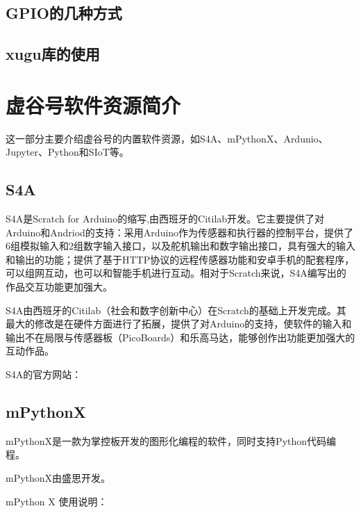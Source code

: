 \documentclass[letterpaper,10pt,english]{sphinxmanual}
\begin{document}
\section{GPIO的几种方式}
\label{\detokenize{04.gpio/4.1:gpio}}\label{\detokenize{04.gpio/4.1::doc}}

\section{xugu库的使用}
\label{\detokenize{04.gpio/4.2:xugu}}\label{\detokenize{04.gpio/4.2::doc}}

\chapter{虚谷号软件资源简介}
\label{\detokenize{05.soft/index:id1}}\label{\detokenize{05.soft/index::doc}}
这一部分主要介绍虚谷号的内置软件资源，如S4A、mPythonX、Ardunio、Jupyter、Python和SIoT等。


\section{S4A}
\label{\detokenize{05.soft/5.1-s4a::doc}}\label{\detokenize{05.soft/5.1-s4a:s4a}}
S4A是Scratch for Arduino的缩写,由西班牙的Citilab开发。它主要提供了对Arduino和Andriod的支持：采用Arduino作为传感器和执行器的控制平台，提供了6组模拟输入和2组数字输入接口，以及舵机输出和数字输出接口，具有强大的输入和输出的功能；提供了基于HTTP协议的远程传感器功能和安卓手机的配套程序，可以组网互动，也可以和智能手机进行互动。相对于Scratch来说，S4A编写出的作品交互功能更加强大。

S4A由西班牙的Citilab（社会和数字创新中心）在Scratch的基础上开发完成。其最大的修改是在硬件方面进行了拓展，提供了对Arduino的支持，使软件的输入和输出不在局限与传感器板（PicoBoards）和乐高马达，能够创作出功能更加强大的互动作品。

S4A的官方网站：


\section{mPythonX}
\label{\detokenize{05.soft/5.2-mPythonX:mpythonx}}\label{\detokenize{05.soft/5.2-mPythonX::doc}}
mPythonX是一款为掌控板开发的图形化编程的软件，同时支持Python代码编程。

mPythonX由盛思开发。

mPython X 使用说明：
\end{document}
